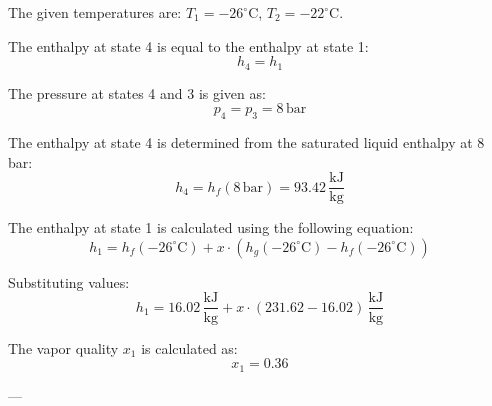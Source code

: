 The given temperatures are:  
\( T_1 = -26^\circ\text{C} \), \( T_2 = -22^\circ\text{C} \).  

The enthalpy at state 4 is equal to the enthalpy at state 1:  
\[
h_4 = h_1
\]  

The pressure at states 4 and 3 is given as:  
\[
p_4 = p_3 = 8 \, \text{bar}
\]  

The enthalpy at state 4 is determined from the saturated liquid enthalpy at 8 bar:  
\[
h_4 = h_f(8 \, \text{bar}) = 93.42 \, \frac{\text{kJ}}{\text{kg}}
\]  

The enthalpy at state 1 is calculated using the following equation:  
\[
h_1 = h_f(-26^\circ\text{C}) + x \cdot \left(h_g(-26^\circ\text{C}) - h_f(-26^\circ\text{C})\right)
\]  

Substituting values:  
\[
h_1 = 16.02 \, \frac{\text{kJ}}{\text{kg}} + x \cdot \left(231.62 - 16.02\right) \, \frac{\text{kJ}}{\text{kg}}
\]  

The vapor quality \( x_1 \) is calculated as:  
\[
x_1 = 0.36
\]  

---